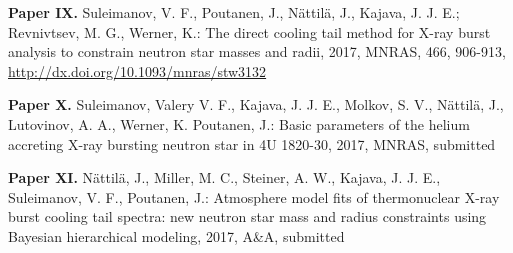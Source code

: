 \vspace{0.3cm}
\textbf{Paper IX.} Suleimanov, V. F., Poutanen, J., Nättilä, J., Kajava, J. J. E.; Revnivtsev, M. G., Werner, K.: The direct cooling tail method for X-ray burst analysis to constrain neutron star masses and radii, 2017, MNRAS, 466, 906-913, \url{http://dx.doi.org/10.1093/mnras/stw3132}
 

\vspace{0.3cm}
\textbf{Paper X.} Suleimanov, Valery V. F., Kajava, J. J. E., Molkov, S. V., Nättilä, J., Lutovinov, A. A., Werner, K. Poutanen, J.: Basic parameters of the helium accreting X-ray bursting neutron star in 4U 1820-30, 2017, MNRAS, submitted


\vspace{0.3cm}
\textbf{Paper XI.} Nättilä, J., Miller, M. C., Steiner, A. W., Kajava, J. J. E., Suleimanov, V. F., Poutanen, J.: Atmosphere model fits of thermonuclear X-ray burst cooling tail spectra: new neutron star mass and radius constraints using Bayesian hierarchical modeling, 2017, A\&A, submitted







